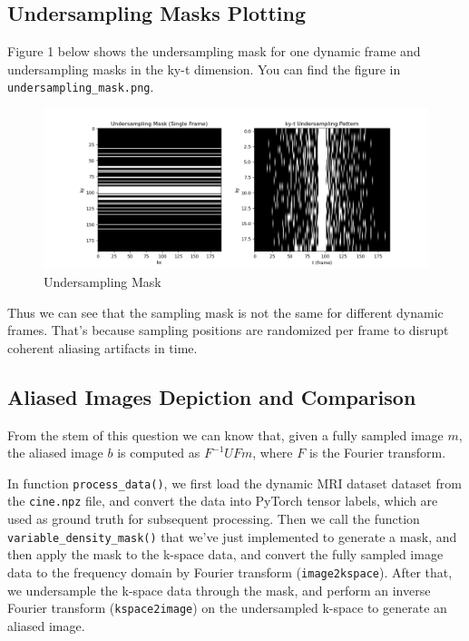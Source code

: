 \documentclass{article}
\begin{document}
\subsection{Undersampling Masks Plotting}
Figure 1 below shows the undersampling mask for one dynamic frame and undersampling masks in the ky-t dimension. 
You can find the figure in \texttt{undersampling\_mask.png}.

\begin{figure}[ht]
  \centering
  \includegraphics[width=\linewidth]{../undersampling_mask.png}
  \caption{Undersampling Mask}
  \label{fig:undersampling mask for one dynamic frame and undersampling masks in the ky-t dimension}
\end{figure}

Thus we can see that the sampling mask is not the same for different dynamic frames. 
That's because sampling positions are randomized per frame to disrupt coherent aliasing artifacts in time.

\subsection{Aliased Images Depiction and Comparison}
From the stem of this question we can know that, given a fully sampled image $m$, 
the aliased image $b$ is computed as $F^{-1} U F m$, where $F$ is the Fourier transform.

In function \texttt{process\_data()}, we first load the dynamic MRI dataset dataset from the \texttt{cine.npz} file, 
and convert the data into PyTorch tensor labels, which are used as ground truth for subsequent processing. Then we 
call the function \texttt{variable\_density\_mask()} that we've just implemented to generate a mask, 
and then apply the mask to the k-space data, and convert the fully sampled image data to the frequency 
domain by Fourier transform (\texttt{image2kspace}). After that, we undersample the k-space data through the mask, 
and perform an inverse Fourier transform (\texttt{kspace2image}) on the undersampled k-space to generate an aliased image.
\end{document}
